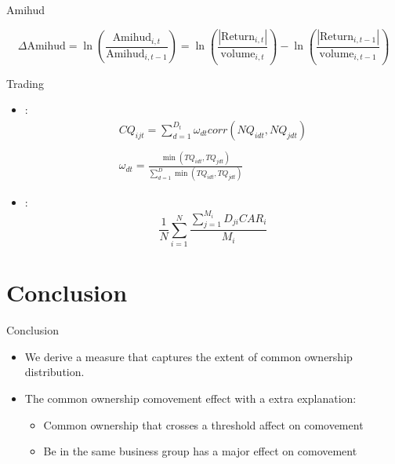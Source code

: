\documentclass{beamer}
\begin{document}
\begin{frame}{Amihud}
	
	\begin{equation*}
		\Delta \text{Amihud} = \ln(\frac{\text{Amihud}_{i,t}}{\text{Amihud}_{i,t-1}}) = 
		\ln({\frac{|\text{Return}_{i,t}|}{\text{volume}_{i,t}}}) - \ln({\frac{|\text{Return}_{i,t-1}|}{\text{volume}_{i,t-1}}})
	\end{equation*}

	\begin{table}[htbp]
	\centering
	\resizebox{0.9\textheight}{!}{
		
	}
\end{table}
	
	
\end{frame}

	\begin{frame}{Trading}{}
		\begin{itemize}
			\item \cite{anton2018dealing}:
			\begin{equation*}
				\begin{array}{l}
					CQ_{ijt} = \sum_{d=1}^{D_t}\omega_{dt}corr(NQ_{idt},NQ_{jdt})
					\\\\
					\omega_{dt} = \frac{\min (TQ_{idt},TQ_{jdt})}{\sum_{d=1}^D \min(TQ_{idt},TQ_{jdt}) }
				\end{array}
			\end{equation*}
		\item \cite{ivashina2011institutional}:
		\begin{equation*}
			\frac{1}{N}\sum_{i = 1}^N\frac{\sum_{j = 1}^{M_i} D_{ji}CAR_i}{M_i}
		\end{equation*}
		\end{itemize}
	\end{frame}
	
	
	
	
	\section{Conclusion}
	
	\begin{frame}{Conclusion}
		\begin{itemize}
			
			\item We derive a measure that captures the extent of common ownership distribution.
			
			
			\item The common ownership comovement effect  with a
			extra explanation:
			\begin{itemize}
				\item Common ownership that  crosses a threshold affect on comovement
				\item Be in the same business group has a major effect on comovement
			\end{itemize} 
		\end{itemize}
	\end{frame}
	
\end{document}
